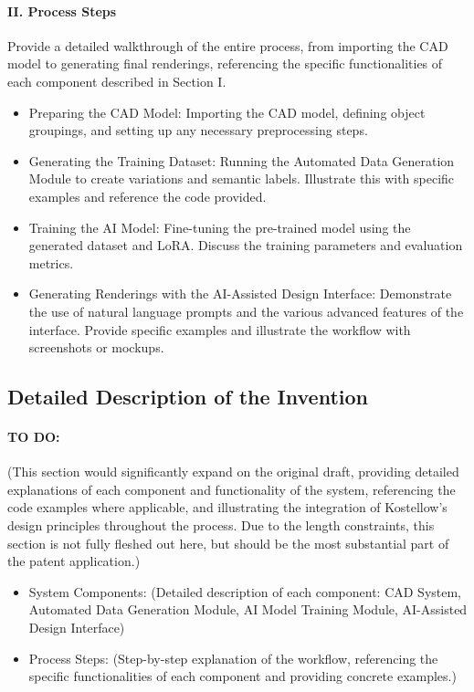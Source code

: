 \documentclass{article}
\begin{document}
\paragraph{II. Process Steps}    

Provide a detailed walkthrough of the entire process, from importing the CAD model to generating final renderings, referencing the specific functionalities of each component described in Section I.

\begin{itemize}
   \item Preparing the CAD Model: Importing the CAD model, defining object groupings, and setting up any necessary preprocessing steps.
   \item Generating the Training Dataset: Running the Automated Data Generation Module to create variations and semantic labels.  Illustrate this with specific examples and reference the code provided.
   \item Training the AI Model:  Fine-tuning the pre-trained model using the generated dataset and LoRA.  Discuss the training parameters and evaluation metrics.
   \item Generating Renderings with the AI-Assisted Design Interface:  Demonstrate the use of natural language prompts and the various advanced features of the interface.  Provide specific examples and illustrate the workflow with screenshots or mockups.
\end{itemize}



\subsection{Detailed Description of the Invention}

\paragraph{TO DO:}
(This section would significantly expand on the original draft, providing detailed explanations of each component and functionality of the system, referencing the code examples where applicable, and illustrating the integration of Kostellow's design principles throughout the process. Due to the length constraints, this section is not fully fleshed out here, but should be the most substantial part of the patent application.)

\begin{itemize}
   \item System Components: (Detailed description of each component: CAD System, Automated Data Generation Module, AI Model Training Module, AI-Assisted Design Interface)
   \item Process Steps: (Step-by-step explanation of the workflow, referencing the specific functionalities of each component and providing concrete examples.)
\end{itemize}
\end{document}
